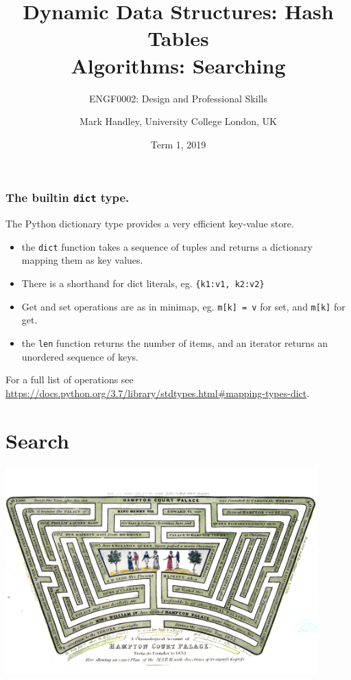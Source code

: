 \documentclass{beamer} %
\author{Mark Handley, University College London, UK}
\title{Dynamic Data Structures: Hash Tables\\Algorithms: Searching}
\subtitle{ENGF0002: Design and Professional Skills }
\date{Term 1, 2019}
\begin{document}
\nobibliography*


\frame{
\titlepage
}

\begin{frame}
\frametitle{The builtin \texttt{dict} type.}

The Python dictionary type provides a very efficient key-value store.
\begin{itemize}
  \item the \texttt{dict} function takes a sequence of tuples and returns a dictionary mapping them as key values.
  \item There is a shorthand for dict literals, eg. \texttt{\{k1:v1, k2:v2\}}
  \item Get and set operations are as in minimap, eg. \texttt{m[k] = v} for set, and \texttt{m[k]} for get.
  \item the \texttt{len} function returns the number of items, and an iterator returns an unordered sequence of keys.
\end{itemize}

\vspace{3mm} 
For a full list of operations see \url{https://docs.python.org/3.7/library/stdtypes.html\#mapping-types-dict}.
\end{frame}




\section{Search}

\begin{frame}
  \centering
  \includegraphics[height=80mm]{assets/hampton1.png}
\end{frame}
\end{document}
